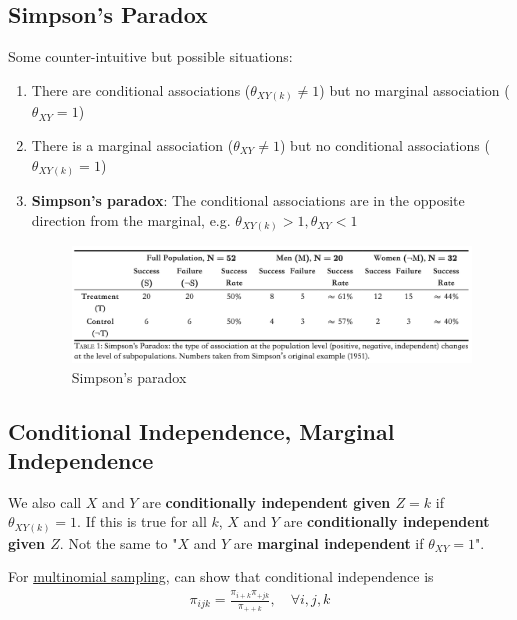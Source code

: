 \documentclass[11pt]{elegantbook}
\begin{document}
\subsection{Simpson's Paradox}
Some counter-intuitive but possible situations:
\begin{enumerate}
    \item There are conditional associations ($\theta_{XY(k)} \neq 1$) but no marginal
    association ($\theta_{XY} = 1$)
    \item There is a marginal association ($\theta_{XY} \neq 1$) but no conditional associations ($\theta_{XY(k)} = 1$)
    \item \textbf{Simpson's paradox}: The conditional associations are in the opposite direction from the marginal, e.g. $\theta_{XY(k)}>1,\theta_{XY}<1$
    \begin{center}\begin{figure}[htbp]
        \centering
        \includegraphics[scale=0.2]{Simpson's Paradox.png}
        \caption{Simpson's paradox}
        \label{}
    \end{figure}\end{center}
\end{enumerate}

\subsection{Conditional Independence, Marginal Independence}
\begin{definition}
    \normalfont
    We also call $X$ and $Y$ are \textbf{conditionally independent given $Z = k$} if $\theta_{XY(k)}=1$. If this is true for all $k$, $X$ and $Y$ are \textbf{conditionally independent given $Z$}. Not the same to "$X$ and $Y$ are \textbf{marginal independent} if $\theta_{XY}=1$".
\end{definition}

\begin{proposition}
    For \underline{multinomial sampling}, can show that conditional independence is
    \begin{equation}
        \begin{aligned}
            \pi_{ijk}=\frac{\pi_{i+k}\pi_{+jk}}{\pi_{++k}},\quad \forall i,j,k
        \end{aligned}
        \nonumber
    \end{equation}
\end{proposition}
\end{document}
